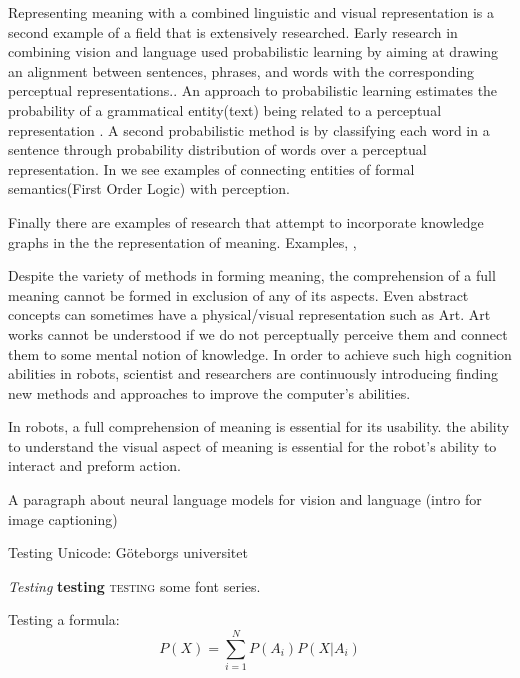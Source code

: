 \documentclass[11pt, a4paper]{article}
\begin{document}
 
Representing meaning with a combined linguistic and visual representation is a second example of a field that is extensively researched. Early research in combining vision and language used probabilistic learning by aiming at drawing an alignment between sentences, phrases, and words with the corresponding perceptual representations.\cite{790410}. An approach  to probabilistic learning estimates the probability of a grammatical entity(text) being related to a perceptual representation \cite{6751319}. A second probabilistic method is by classifying each word in a sentence through probability distribution of words over a perceptual representation. In \cite{matuszek2012joint} \cite{larsson2015formal} we see examples of connecting entities of formal semantics(First Order Logic) with perception. 

Finally there are examples of research that attempt to incorporate knowledge graphs in the the representation of meaning. Examples, \cite{zhu2015building}, \cite{zhu2014reasoning}

Despite the variety of methods in forming meaning, the comprehension of a full meaning cannot be formed in exclusion of any of its aspects. Even abstract concepts can sometimes have a physical/visual representation such as Art. Art works cannot be understood if we do not perceptually perceive them and connect them to some mental notion of knowledge. In order to achieve such high cognition abilities in robots, scientist and researchers are continuously introducing finding new methods and approaches to improve the computer's abilities.  

In  robots, a full comprehension of meaning is essential for its usability. 
the ability to understand the visual aspect of meaning is essential for the robot's ability to interact and preform action. 

A paragraph about neural language models for vision and language (intro for image captioning)







Testing Unicode: Göteborgs universitet

\textit{Testing} \textbf{testing} \textsc{testing} some font series.

Testing a formula:
\[
P(X) = \sum_{i=1}^N P(A_i) P(X|A_i)
\]
\end{document}
